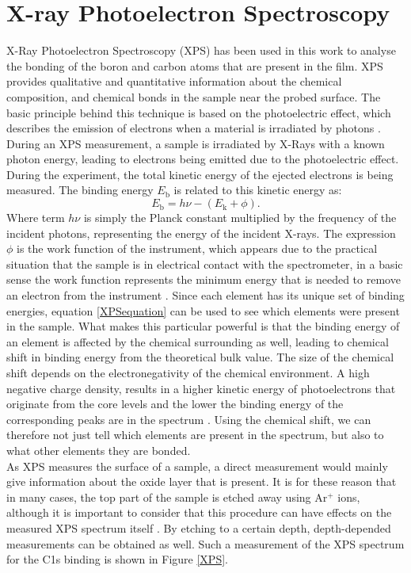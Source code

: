 \section{X-ray Photoelectron Spectroscopy}
X-Ray Photoelectron Spectroscopy (XPS) has been used in this work to analyse the bonding of the boron and carbon atoms that are present in the film. XPS provides qualitative and quantitative information about the chemical composition, and chemical bonds in the sample near the probed surface. The basic principle behind this technique is based on the photoelectric effect, which describes the emission of electrons when a material is irradiated by photons \cite{Einstein}. During an XPS measurement, a sample is irradiated by X-Rays with a known photon energy, leading to electrons being emitted due to the photoelectric effect. During the experiment, the total kinetic energy of the ejected electrons is being measured. The binding energy $E_\text{b}$ is related to this kinetic energy as:
\begin{equation}\label{XPSequation}
	E_\text{b} = h\nu - (E_\text{k} + \phi).
\end{equation}
Where term $h\nu$ is simply the Planck constant multiplied by the frequency of the incident photons, representing the energy of the incident X-rays. The expression $\phi$ is the work function of the instrument, which appears due to the practical situation that the sample is in electrical contact with the spectrometer, in a basic sense the work function  represents the minimum energy that is needed to remove an electron from the instrument \cite{XPS_book}. Since each element has its unique set of binding energies, equation \ref{XPSequation} can be used to see which elements were present in the sample. What makes this particular powerful is that the binding energy of an element is affected by the chemical surrounding as well, leading to chemical shift in binding energy from the theoretical bulk value. The size of the chemical shift depends on the electronegativity of the chemical environment. A high negative charge density, results in a higher kinetic energy of photoelectrons that originate from the core levels and the lower the binding energy of the corresponding peaks are in the spectrum \cite{XPS2}. Using the chemical shift, we can therefore not just tell which elements are present in the spectrum, but also to what other elements they are bonded. \\
As XPS measures the surface of a sample, a direct measurement would mainly give information about the oxide layer that is present. It is for these reason that in many cases, the top part of the sample is etched away using Ar$^{+}$ ions, although it is important to consider that this procedure can have effects on the measured XPS spectrum itself \cite{XPS_clean_sputter}. By etching to a certain depth, depth-depended measurements can be obtained as well. Such a measurement of the XPS spectrum for the C1s binding is shown in Figure \ref{XPS}.
